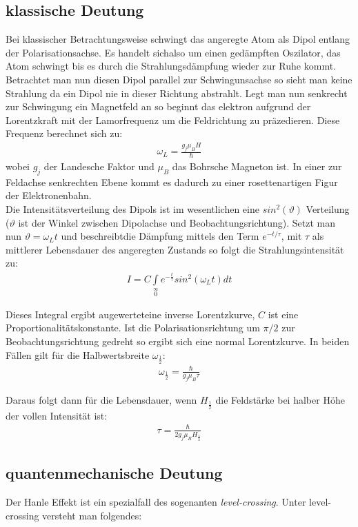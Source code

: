 \documentclass[12pt]{article}
\begin{document}
\subsection{klassische Deutung}
Bei klassischer Betrachtungsweise schwingt das angeregte Atom als Dipol entlang der Polarisationsachse. Es handelt sichalso um einen gedämpften Oszilator, das Atom schwingt bis es durch die Strahlungsdämpfung wieder zur Ruhe kommt. Betrachtet man nun diesen Dipol parallel zur Schwingunsachse so sieht man keine Strahlung da ein Dipol nie in dieser Richtung abstrahlt. Legt man nun senkrecht zur Schwingung ein Magnetfeld an so beginnt das elektron aufgrund der Lorentzkraft mit der Lamorfrequenz um die Feldrichtung zu präzedieren. Diese Frequenz berechnet sich zu:
\begin{align}
 \omega_L=\frac{g_j \mu_B H}{\hbar}
\end{align}
wobei $g_j$ der Landesche Faktor und $\mu_B$ das Bohrsche Magneton ist. In einer zur Feldachse senkrechten Ebene kommt es dadurch zu einer rosettenartigen Figur der Elektronenbahn.
\\
Die Intensitätsverteilung des Dipols ist im wesentlichen eine $sin^2(\vartheta)$ Verteilung ($\vartheta$ ist der
Winkel zwischen Dipolachse und Beobachtungsrichtung). Setzt man nun $\vartheta = \omega_L t$ und beschreibtdie Dämpfung mittels den Term $e^{-t/\tau}$, mit $\tau$ als mittlerer Lebensdauer des angeregten Zustands so folgt die Strahlungsintensität zu:
\begin{align}
 I = C \int \limits_{0} \limits^{\infty} e^{-\frac{t}{\tau}}sin^2(\omega_L t) dt
\end{align}

Dieses Integral ergibt augewerteteine inverse Lorentzkurve, $C$ ist eine Proportionalitätskonstante. Ist die Polarisationsrichtung um $\pi/2$ zur Beobachtungsrichtung gedreht so ergibt sich eine normal Lorentzkurve. In beiden Fällen gilt für die Halbwertsbreite $\omega_{\frac{1}{2}}$:
\begin{align}
 \omega_{\frac{1}{2}}= \frac{\hbar}{g_j \mu_B\tau}
\end{align}

Daraus folgt dann für die Lebensdauer, wenn $H_{\frac{1}{2}}$ die Feldstärke bei halber Höhe der vollen Intensität ist:
\begin{align}
 \tau = \frac{\hbar}{2 g_j \mu_B H_{\frac{1}{2}}}
\end{align}

\subsection{quantenmechanische Deutung}
Der Hanle Effekt ist ein spezialfall des sogenanten \textit{level-crossing}. Unter level-crossing versteht man folgendes:
\end{document}
